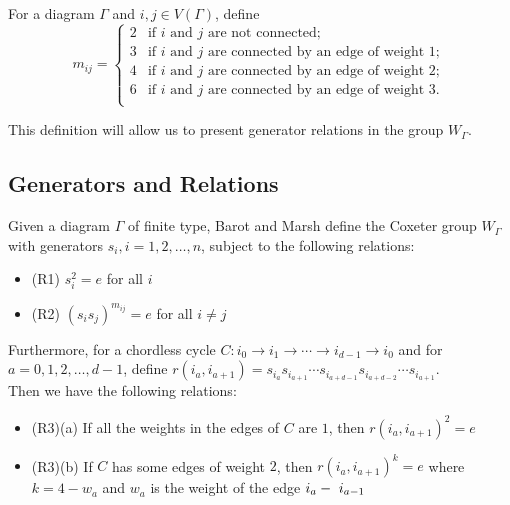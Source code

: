 \documentclass{beamer}
\begin{document}
\begin{frame}
\begin{definition}
For a diagram $\Gamma$ and $i, j \in V(\Gamma)$, define 
\begin{displaymath}
m_{ij} = \begin{cases}    2 & \mbox{if } i \mbox{ and } j \mbox{ are not connected;} \\
																	3 & \mbox{if } i \mbox{ and } j \mbox{ are connected by an edge of weight } 1;\\
																	4 & \mbox{if } i \mbox{ and } j \mbox{ are connected by an edge of weight } 2;\\
																	6 & \mbox{if } i \mbox{ and } j \mbox{ are connected by an edge of weight } 3.\\
					\end{cases}
\end{displaymath}	
\end{definition}

This definition will allow us to present generator relations in the group $W_{\Gamma}$.
\end{frame}

\subsection{Generators and Relations}

\begin{frame}

Given a diagram $\Gamma$ of finite type, Barot and Marsh define the Coxeter group $W_{\Gamma}$ with generators $s_i, i = 1,2,\ldots, n$, subject to the following relations:
\begin{block}
   
\begin{itemize}
\item{\alert{(R1)}} $s_i^2 = e$ for all $i$
\item{\alert{(R2)}} $\left(s_is_j\right)^{m_{ij}} = e$ for all $i \neq j$
\end{itemize}

Furthermore, for a chordless cycle $C : i_0 \rightarrow i_1 \rightarrow \cdots \rightarrow i_{d-1} \rightarrow i_0$ and for $a = 0,1,2,\ldots, d-1$, define \textbf{$r\left(i_a, i_{a+1}\right) = s_{i_a}s_{i_{a+1}} \cdots s_{i_{a+d-1}}s_{i_{a+d-2}} \cdots s_{i_{a+1}}$}.\\

\vspace{0.1cm}
Then we have the following relations:
\begin{itemize}
\item{\alert{(R3)(a)}} If all the weights in the edges of $C$ are $1$, then $r(i_a, i_{a+1})^2 = e$
\item{\alert{(R3)(b)}} If $C$ has some edges of weight $2$, then $r(i_a, i_{a+1})^k = e$ where $k = 4-w_a$ and $w_a$ is the weight of the edge $i_a\--\ i_{a-1}$
\end{itemize}
\end{block}
\end{frame}
\end{document}
